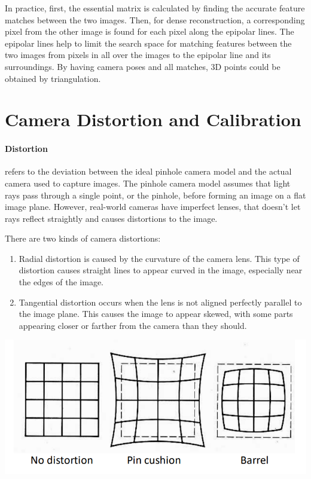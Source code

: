 \documentclass[11pt]{article}
\begin{document}
    In practice, first, the essential matrix is calculated by finding the accurate feature matches between
    the two images. Then, for dense reconstruction, a corresponding pixel from the other image is found for
    each pixel along the epipolar lines. The epipolar lines help to limit the search space for matching features between the two images
    from pixels in all over the images to the epipolar line and its surroundings. By having camera poses and all
    matches, 3D points could be obtained by triangulation.

    \section{Camera Distortion and Calibration}

    \paragraph{Distortion} refers to the deviation between the ideal pinhole camera model and the actual camera
    used to capture images. The pinhole camera model assumes that light rays pass through a single point, or
    the pinhole, before forming an image on a flat image plane. However, real-world cameras have imperfect
    lenses, that doesn't let rays reflect straightly and causes distortions to the image.

    There are two kinds of camera distortions:

    \begin{enumerate}
        \item Radial distortion is caused by the curvature of the camera lens. This type of distortion
        causes straight lines to appear curved in the image, especially near the edges of the image.
        \item Tangential distortion occurs when the lens is not aligned perfectly parallel to the image plane.
        This causes the image to appear skewed, with some parts appearing closer or farther from the camera
        than they should.
    \end{enumerate}
    {\includegraphics[width=\textwidth,height=\textheight,keepaspectratio]{distortion.PNG}}
\end{document}
